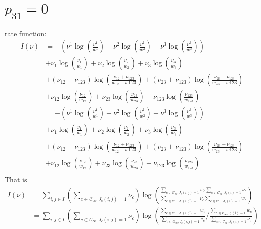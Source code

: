 \documentclass[11pt,en,cite=authoryear]{elegantpaper}
\begin{document}
\section{$p_{31}=0$}
rate function:
\begin{align*}
    I(\nu)
    &= -(\nu^{1} \log (\frac{\nu^{1}}{w^{1}}) + \nu^{2} \log (\frac{\nu^{2}}{w^{2}}) + \nu^{3} \log (\frac{\nu^{3}}{w^{3}})) \\
    &+ \nu_{1} \log (\frac{\nu_{1}}{w_{1}}) + \nu_{2} \log (\frac{\nu_{2}}{w_{2}}) + \nu_{3} \log (\frac{\nu_{3}}{w_{3}}) \\
    &+ (\nu_{12}+\nu_{123}) \log(\frac{\nu_{12}+\nu_{123}}{w_{12}+w{123}}) +
    (\nu_{23}+\nu_{123}) \log(\frac{\nu_{23}+\nu_{123}}{w_{23}+w{123}}) \\
    &+ \nu_{12} \log(\frac{\nu_{12}}{w_{12}}) + \nu_{23} \log(\frac{\nu_{23}}{w_{23}}) + \nu_{123} \log(\frac{\nu_{123}}{w_{123}}) \\
    &= -(\nu^{1} \log (\frac{\nu^{1}}{w^{1}}) + \nu^{2} \log (\frac{\nu^{2}}{w^{2}}) + \nu^{3} \log (\frac{\nu^{3}}{w^{3}})) \\
    &+ \nu_{1} \log (\frac{\nu_{1}}{w_{1}}) + \nu_{2} \log (\frac{\nu_{2}}{w_{2}}) + \nu_{3} \log (\frac{\nu_{3}}{w_{3}}) \\
    &+ (\nu_{12}+\nu_{123}) \log(\frac{\nu_{12}+\nu_{123}}{w_{12}+w{123}}) +
    (\nu_{23}+\nu_{123}) \log(\frac{\nu_{23}+\nu_{123}}{w_{23}+w{123}}) \\
    &+ \nu_{12} \log(\frac{\nu_{12}}{w_{12}}) + \nu_{23} \log(\frac{\nu_{23}}{w_{23}}) + \nu_{123} \log(\frac{\nu_{123}}{w_{123}}) \\
\end{align*}
That is
\begin{align*}
    I(\nu) &=  \sum_{i, j \in I} \left(\sum_{c \in \mathcal{C_{\infty}}, J_c(i, j)=1}
    \nu_c \right) \log(\frac{\sum_{c \in \mathcal{C_{\infty}}, J_c(i, j)=1} w_c \sum_{c \in \mathcal{C_{\infty}}, J_c(i)=1} \nu_c}{\sum_{c \in \mathcal{C_{\infty}}, J_c(i, j)=1} \nu_c \sum_{c \in \mathcal{C_{\infty}}, J_c(i)=1} w_c}) \\
    &= \sum_{i, j \in I} \left(\sum_{c \in \mathcal{C_{\infty}}, J_c(i, j)=1}
    \nu_c \right) \log(\frac{\sum_{c \in \mathcal{C_{\infty}}, J_c(i, j)=1} w_c }{\sum_{c \in \mathcal{C_{\infty}}, J_c(i, j)=1} \nu_c }
    /\frac{\sum_{c \in \mathcal{C_{\infty}}, J_c(i)=1} w_c}{\sum_{c \in \mathcal{C_{\infty}}, J_c(i)=1} \nu_c}) \\
\end{align*}
\end{document}
